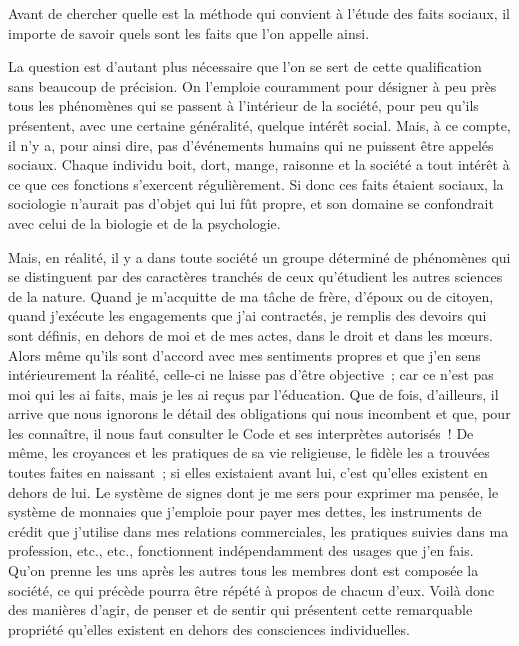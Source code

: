 \documentclass[french,twoside]{book} %
\newcommand\chaptercont{} %
\begin{document}
\chaptercont
\noindent Avant de chercher quelle est la méthode qui convient à l’étude des faits sociaux, il importe de savoir quels sont les faits que l’on appelle ainsi.\par
La question est d’autant plus nécessaire que l’on se sert de cette qualification sans beaucoup de précision. On l’emploie couramment pour désigner à peu près tous les phénomènes qui se passent à l’intérieur de la société, pour peu qu’ils présentent, avec une certaine généralité, quelque intérêt social. Mais, à ce compte, il n’y a, pour ainsi dire, pas d’événements humains qui ne puissent être appelés sociaux. Chaque individu boit, dort, mange, raisonne et la société a tout intérêt à ce que ces fonctions s’exercent régulièrement. Si donc ces faits étaient sociaux, la sociologie n’aurait pas d’objet qui lui fût propre, et son domaine se confondrait avec celui de la biologie et de la psychologie.\par
Mais, en réalité, il y a dans toute société un groupe déterminé de phénomènes qui se distinguent par des caractères tranchés de ceux qu’étudient les autres sciences de la nature. Quand je m’acquitte de ma tâche de frère, d’époux ou de citoyen, quand j’exécute les engagements que j’ai contractés, je remplis des devoirs qui sont définis, en dehors de moi et de mes actes, dans le droit et dans les mœurs. Alors même qu’ils sont d’accord avec mes sentiments propres et que j’en sens intérieurement la réalité, celle-ci ne laisse pas d’être objective ; car ce n’est pas moi qui les ai faits, mais je les ai reçus par l’éducation. Que de fois, d’ailleurs, il arrive que nous ignorons le détail des obligations qui nous incombent et que, pour les connaître, il nous faut consulter le Code et ses interprètes autorisés ! De même, les croyances et les pratiques de sa vie religieuse, le fidèle les a trouvées toutes faites en naissant ; si elles existaient avant lui, c’est qu’elles existent en dehors de lui. Le système de signes dont je me sers pour exprimer ma pensée, le système de monnaies que j’emploie pour payer mes dettes, les instruments de crédit que j’utilise dans mes relations commerciales, les pratiques suivies dans ma profession, etc., etc., fonctionnent indépendamment des usages que j’en fais. Qu’on prenne les uns après les autres tous les membres dont est composée la société, ce qui précède pourra être répété à propos de chacun d’eux. Voilà donc des manières d’agir, de penser et de sentir qui présentent cette remarquable propriété qu’elles existent en dehors des consciences individuelles.\par
\end{document}
